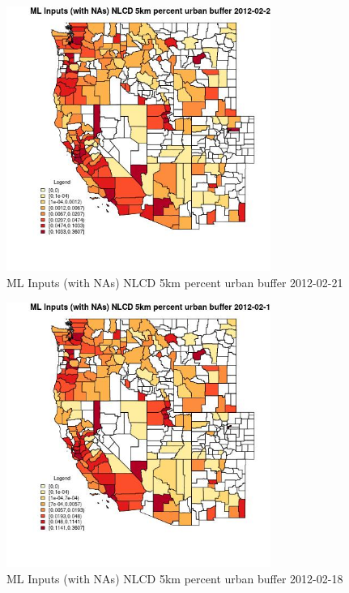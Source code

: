 \begin{figure} 
\centering  
\includegraphics[width=0.77\textwidth]{Code_Outputs/Report_ML_input_PM25_Step4_part_f_de_duplicated_aves_prioritize_24hr_obswNAs_CountyNLCD_5km_percent_urban_bufferMean2012-02-21.jpg} 
\caption{\label{fig:Report_ML_input_PM25_Step4_part_f_de_duplicated_aves_prioritize_24hr_obswNAsCountyNLCD_5km_percent_urban_bufferMean2012-02-21}ML Inputs (with NAs) NLCD 5km percent urban buffer 2012-02-21} 
\end{figure} 
 

\begin{figure} 
\centering  
\includegraphics[width=0.77\textwidth]{Code_Outputs/Report_ML_input_PM25_Step4_part_f_de_duplicated_aves_prioritize_24hr_obswNAs_CountyNLCD_5km_percent_urban_bufferMean2012-02-18.jpg} 
\caption{\label{fig:Report_ML_input_PM25_Step4_part_f_de_duplicated_aves_prioritize_24hr_obswNAsCountyNLCD_5km_percent_urban_bufferMean2012-02-18}ML Inputs (with NAs) NLCD 5km percent urban buffer 2012-02-18} 
\end{figure} 
 

